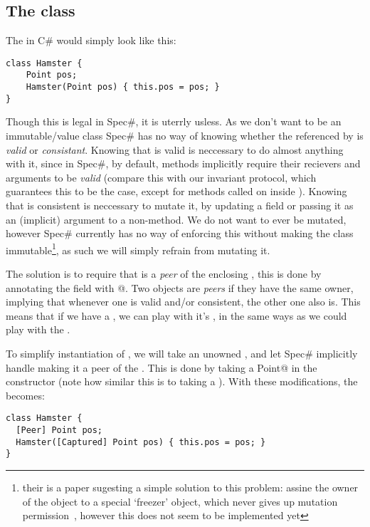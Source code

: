 \subsection{The \Q@Hamster@ class} 
The \Q@Hamster@ in C\# would simply look like this:
\begin{lstlisting}
class Hamster {
	Point pos;
	Hamster(Point pos) { this.pos = pos; }
}
\end{lstlisting}
Though this is legal in Spec\#, it is uterrly usless. As we don't want \Q@Point@ to be an immutable/value class Spec\# has no way of knowing whether the \Q@Point@ referenced by \Q@pos@ is \emph{valid} or \emph{consistant}. Knowing that \Q@pos@ is valid is neccessary to do almost anything with it, since in Spec\#, by default, methods implicitly require their recievers and arguments to be \emph{valid} (compare this with our invariant protocol, which guarantees this to be the case, except for methods called on \Q@this@ inside \Q@invariant@).
Knowing that \Q@pos@ is consistent is neccessary to mutate it, by updating a field or passing it as an (implicit) argument to a non-\Q@Pure@ method. We do not want \Q@pos@ to ever be mutated, however Spec\# currently has no way of enforcing this without making the \Q@Point@ class immutable\footnote{their is a paper sugesting a simple solution to this problem: assine the owner of the object to a special `freezer' object, which never gives up mutation permission~\cite{DBLP:conf/vstte/LeinoMW08}, however this does not seem to be implemented yet }, as such we will simply refrain from mutating it.

The solution is to require that \Q@pos@ is a \emph{peer} of the enclosing \Q@Hamster@, this is done by annotating the field with \Q@[Peer]@. Two objects are \emph{peers} if they have the same owner, implying that  whenever one is valid and/or consistent, the other one also is. This means that if we have a \Q@Hamster@, we can play with it's \Q@pos@, in the same ways as we could play with the \Q@Hamster@.

To simplify instantiation of \Q@Hamster@s, we will take an unowned \Q@Point@, and let Spec\# implicitly handle making it a peer of the \Q@Hamster@. This is done by taking a \Q@[Captured] Point@ in the constructor (note how similar this is to taking a \Q@capsule@). With these modifications, the \Q@Hamster@ becomes:
\begin{lstlisting}
class Hamster {
  [Peer] Point pos;
  Hamster([Captured] Point pos) { this.pos = pos; }
}
\end{lstlisting}

